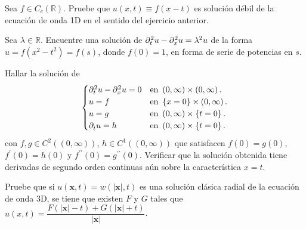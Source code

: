 \question

Sea $f\in C_{c}\left(\mathbb{R}\right)$.
Pruebe que $u\left(x,t\right)\equiv f\left(x-t\right)$ es solución
débil de la ecuación de onda 1D en el sentido del ejercicio anterior.

\question

Sea $\lambda\in\mathbb{R}$.
Encuentre una solución de
\begin{math}
	\difcp[2]{u}{t}-
	\difcp[2]{u}{x}=
	\lambda^{2}u
\end{math} de la forma $u=f\left(x^{2}-t^{2}\right)=f\left(s\right)$,
donde $f\left(0\right)=1$, en forma de serie de potencias en $s$.

\question

Hallar la solución de
\begin{equation*}
	\begin{cases}
		\difcp[2]{u}{t}-
		\difcp[2]{u}{x}=0 &
		\text{en }\left(0,\infty\right)\times\left(0,\infty\right). \\
		u=f               &
		\text{en }\left\{x=0\right\}\times\left(0,\infty\right).    \\
		u=g               &
		\text{en }\left(0,\infty\right)\times\left\{t=0\right\}.    \\
		\difcp{u}{t}=h    &
		\text{en }\left(0,\infty\right)\times\left\{t=0\right\}.
	\end{cases}
\end{equation*}
con $f,g\in C^{2}\left(\left(0,\infty\right)\right)$,
$h\in C^{1}\left(\left(0,\infty\right)\right)$ que satisfacen
$f\left(0\right)=g\left(0\right)$,
$f^{\prime}\left(0\right)=h\left(0\right)$
y $f^{\prime\prime}\left(0\right)=g^{\prime\prime}\left(0\right)$.
Verificar que la solución obtenida tiene derivadas de segundo orden
continuas aún sobre la característica $x=t$.

\question

Pruebe que si
\begin{math}
	u\left(\symbf{x},t\right)=
	w\left(\left|\symbf{x}\right|,t\right)
\end{math}
es una solución clásica radial de la ecuación de onda 3D, se tiene
que existen $F$ y $G$ tales que
\begin{math}
	u\left(x,t\right)=
	\dfrac{
		F\left(\left|\symbf{x}\right|-t\right)+
		G\left(\left|\symbf{x}\right|+t\right)
	}{\left|\symbf{x}\right|}
\end{math}.

\question

